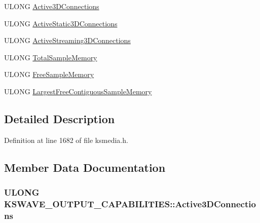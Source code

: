 \begin{DoxyCompactItemize}
\item 
U\+L\+O\+NG \hyperlink{struct_k_s_w_a_v_e___o_u_t_p_u_t___c_a_p_a_b_i_l_i_t_i_e_s_a8bb588d04e2b1adb399c8cd95ce87fb1}{Active3\+D\+Connections}
\item 
U\+L\+O\+NG \hyperlink{struct_k_s_w_a_v_e___o_u_t_p_u_t___c_a_p_a_b_i_l_i_t_i_e_s_a2ca1da47711d48a60f940d4430e61f28}{Active\+Static3\+D\+Connections}
\item 
U\+L\+O\+NG \hyperlink{struct_k_s_w_a_v_e___o_u_t_p_u_t___c_a_p_a_b_i_l_i_t_i_e_s_ad365d1ba5fc0e6988bbf926279ad6faf}{Active\+Streaming3\+D\+Connections}
\item 
U\+L\+O\+NG \hyperlink{struct_k_s_w_a_v_e___o_u_t_p_u_t___c_a_p_a_b_i_l_i_t_i_e_s_a415cf8a2c6f8c7f319cec8749a3bb27a}{Total\+Sample\+Memory}
\item 
U\+L\+O\+NG \hyperlink{struct_k_s_w_a_v_e___o_u_t_p_u_t___c_a_p_a_b_i_l_i_t_i_e_s_a83d085441d659cb1f064d22ee4721391}{Free\+Sample\+Memory}
\item 
U\+L\+O\+NG \hyperlink{struct_k_s_w_a_v_e___o_u_t_p_u_t___c_a_p_a_b_i_l_i_t_i_e_s_a8f2518f257df6ae6e960c0de173bb20d}{Largest\+Free\+Contiguous\+Sample\+Memory}
\end{DoxyCompactItemize}


\subsection{Detailed Description}


Definition at line 1682 of file ksmedia.\+h.



\subsection{Member Data Documentation}
\subsubsection[{\texorpdfstring{Active3\+D\+Connections}{Active3DConnections}}]{\setlength{\rightskip}{0pt plus 5cm}U\+L\+O\+NG K\+S\+W\+A\+V\+E\+\_\+\+O\+U\+T\+P\+U\+T\+\_\+\+C\+A\+P\+A\+B\+I\+L\+I\+T\+I\+E\+S\+::\+Active3\+D\+Connections}\hypertarget{struct_k_s_w_a_v_e___o_u_t_p_u_t___c_a_p_a_b_i_l_i_t_i_e_s_a8bb588d04e2b1adb399c8cd95ce87fb1}{}\label{struct_k_s_w_a_v_e___o_u_t_p_u_t___c_a_p_a_b_i_l_i_t_i_e_s_a8bb588d04e2b1adb399c8cd95ce87fb1}


